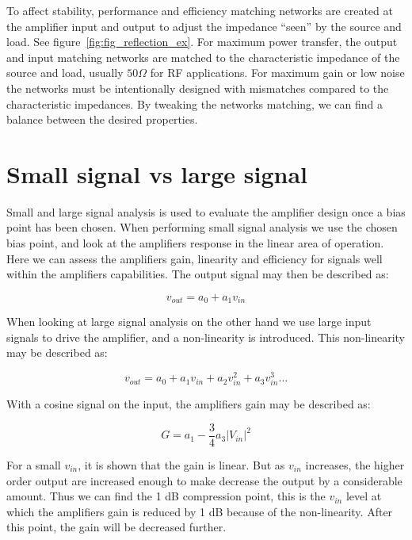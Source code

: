 To affect stability, performance and efficiency matching networks are created at the amplifier input and output to adjust the impedance “seen” by the source and load. See figure~\ref{fig:fig_reflection_ex}. For maximum power transfer, the output and input matching networks are matched to the characteristic impedance of the source and load, usually $50\Omega$ for RF applications. For maximum gain or low noise the networks must be intentionally designed with mismatches compared to the characteristic impedances. By tweaking the networks matching, we can find a balance between the desired properties.

\section{Small signal vs large signal}

Small and large signal analysis is used to evaluate the amplifier design once a bias point has been chosen. When performing small signal analysis we use the chosen bias point, and look at the amplifiers response in the linear area of operation. Here we can assess the amplifiers gain, linearity and efficiency for signals well within the amplifiers capabilities. The output signal may then be described as:

\begin{equation}
v_{out}=a_0+a_1v_{in}
\end{equation}

When looking at large signal analysis on the other hand we use large input signals to drive the amplifier, and a non-linearity is introduced. This non-linearity may be described as:

\begin{equation}
	v_{out}=a_0+a_1v_{in}+a_2v_{in}^2+a_3v_{in}^3 \dots
	\label{eq:eq_non_linearity}
\end{equation}

With a cosine signal on the input, the amplifiers gain may be described as:

\begin{equation}
	G=a_1-\frac{3}{4}a_3|V_{in}|^2
\end{equation}

For a small $v_{in}$, it is shown that the gain is linear. But as $v_{in}$ increases, the higher order output are increased enough to make decrease the output by a considerable amount. Thus we can find the 1 dB compression point, this is the $v_{in}$ level at which the amplifiers gain is reduced by 1 dB because of the non-linearity. After this point, the gain will be decreased further.

